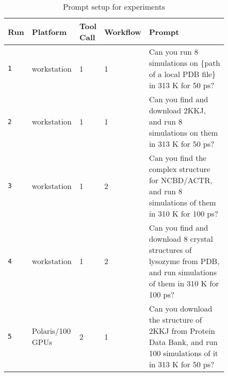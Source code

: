 \begin{table*}
  \caption{Prompt setup for experiments}
  \label{tab:prompts}
  \begin{tabular}{p{0.05\linewidth}p{0.2\linewidth}p{0.1\linewidth}p{0.1\linewidth}p{0.45\linewidth}}
    \toprule
    Run & Platform & Tool Call & Workflow& Prompt\\
    \midrule
    \texttt{1} & workstation & 1 & 1 &Can you run 8 simulations on \{path of a local PDB file\} in 313 K for 50 ps? \\
    \texttt{2} & workstation & 1 & 1 &Can you find and download 2KKJ, and run 8 simulations on them in 313 K for 50 ps? \\
    \texttt{3}& workstation & 1 & 2 &Can you find the complex structure for NCBD/ACTR,  and run 8 simulations of them in 310 K for 100 ps? \\
    \texttt{4}& workstation& 1 & 2 &Can you find and download 8 crystal structures of lysozyme from PDB, and run simulations of them in 310 K for 100 ps? \\
    \texttt{5}& Polaris/100 GPUs& 2 & 1 &Can you download the structure of 2KKJ from Protein Data Bank, and run 100 simulations of it in 313 K for 50 ps?\\
    \bottomrule
  \end{tabular}
\end{table*}
